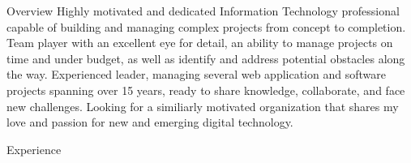 \documentclass[12pt]{resume}
\begin{document}
\begin{rSection}{Overview}
Highly motivated and dedicated Information Technology professional capable of building and managing complex projects from concept to completion. Team player with an excellent eye for detail, an ability to manage projects on time and under budget, as well as identify and address potential obstacles along the way. Experienced leader, managing several web application and software projects spanning over 15 years, ready to share knowledge, collaborate, and face new challenges. Looking for a similiarly motivated organization that shares my love and passion for new and emerging digital technology.
\end{rSection}

\begin{rSection}{Experience}


\end{rSection}
\end{document}
